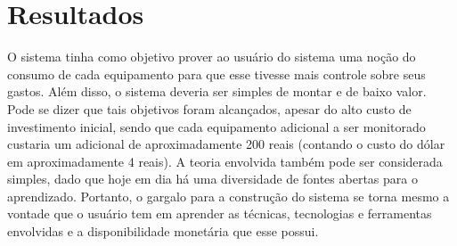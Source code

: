 \section{Resultados}
\label{Sec:6-resultados}

O sistema tinha como objetivo prover ao usuário do sistema uma noção do consumo de cada equipamento para que esse tivesse mais controle sobre seus gastos. Além disso, o sistema deveria ser simples de montar e de baixo valor. Pode se dizer que tais objetivos foram alcançados, apesar do alto custo de investimento inicial, sendo que cada equipamento adicional a ser monitorado custaria um adicional de aproximadamente 200 reais (contando o custo do dólar em aproximadamente 4 reais). A teoria envolvida também pode ser considerada simples, dado que hoje em dia há uma diversidade de fontes abertas para o aprendizado. Portanto, o gargalo para a construção do sistema se torna mesmo a vontade que o usuário tem em aprender as técnicas, tecnologias e ferramentas envolvidas e a disponibilidade monetária que esse possui.